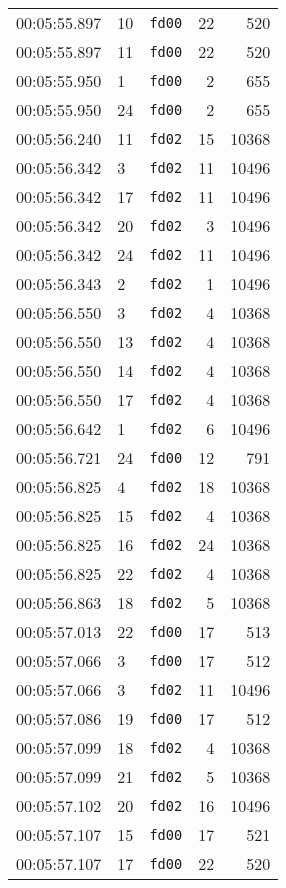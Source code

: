 \documentclass{article}
\begin{document}
\begin{longtable}{lllrr}
00:05:55.897 & 10 & \texttt{fd00} & 22 & 520 \\
00:05:55.897 & 11 & \texttt{fd00} & 22 & 520 \\
00:05:55.950 & 1 & \texttt{fd00} & 2 & 655 \\
00:05:55.950 & 24 & \texttt{fd00} & 2 & 655 \\
00:05:56.240 & 11 & \texttt{fd02} & 15 & 10368 \\
00:05:56.342 & 3 & \texttt{fd02} & 11 & 10496 \\
00:05:56.342 & 17 & \texttt{fd02} & 11 & 10496 \\
00:05:56.342 & 20 & \texttt{fd02} & 3 & 10496 \\
00:05:56.342 & 24 & \texttt{fd02} & 11 & 10496 \\
00:05:56.343 & 2 & \texttt{fd02} & 1 & 10496 \\
00:05:56.550 & 3 & \texttt{fd02} & 4 & 10368 \\
00:05:56.550 & 13 & \texttt{fd02} & 4 & 10368 \\
00:05:56.550 & 14 & \texttt{fd02} & 4 & 10368 \\
00:05:56.550 & 17 & \texttt{fd02} & 4 & 10368 \\
00:05:56.642 & 1 & \texttt{fd02} & 6 & 10496 \\
00:05:56.721 & 24 & \texttt{fd00} & 12 & 791 \\
00:05:56.825 & 4 & \texttt{fd02} & 18 & 10368 \\
00:05:56.825 & 15 & \texttt{fd02} & 4 & 10368 \\
00:05:56.825 & 16 & \texttt{fd02} & 24 & 10368 \\
00:05:56.825 & 22 & \texttt{fd02} & 4 & 10368 \\
00:05:56.863 & 18 & \texttt{fd02} & 5 & 10368 \\
00:05:57.013 & 22 & \texttt{fd00} & 17 & 513 \\
00:05:57.066 & 3 & \texttt{fd00} & 17 & 512 \\
00:05:57.066 & 3 & \texttt{fd02} & 11 & 10496 \\
00:05:57.086 & 19 & \texttt{fd00} & 17 & 512 \\
00:05:57.099 & 18 & \texttt{fd02} & 4 & 10368 \\
00:05:57.099 & 21 & \texttt{fd02} & 5 & 10368 \\
00:05:57.102 & 20 & \texttt{fd02} & 16 & 10496 \\
00:05:57.107 & 15 & \texttt{fd00} & 17 & 521 \\
00:05:57.107 & 17 & \texttt{fd00} & 22 & 520 \\

\end{longtable}
\end{document}
